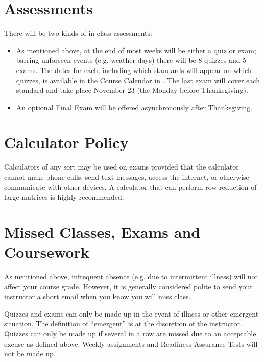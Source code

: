\documentclass{article}
\begin{document}
\section*{\fontsize{12}{15}\selectfont Assessments}
There will be two kinds of in class assessments:
\begin{itemize}
\item As mentioned above, at the end of most weeks will be either a quiz or exam; barring unforseen events (e.g. weather days) there will be 8 quizzes and 5 exams.   The dates for each, including which standards will appear on which quizzes, is available in the Course Calendar in \LMS. The last exam will cover each standard and take place November 23 (the Monday before Thanksgiving).
\item An optional Final Exam will be offered asynchronously after Thanksgiving. 
\end{itemize}

\section*{\fontsize{12}{15}\selectfont Calculator Policy}

Calculators of any sort may be used on exams provided that the calculator cannot make phone calls, send text messages, access the internet, or otherwise communicate with other devices.  A calculator that can perform row reduction of large matrices is highly recommended.

\section*{\fontsize{12}{15}\selectfont Missed Classes, Exams and Coursework}

As mentioned above, infrequent absence (e.g. due to intermittent illness) will not affect your course grade.  However, it is generally considered polite to send your instructor a short email when you know you will miss class.  

Quizzes and exams can only be made up in the event of illness or other emergent situation.  The definition of ``emergent'' is at the discretion of the instructor. Quizzes can only be made up if several in a row are missed due to an acceptable excuse as defined above. Weekly assignments and Readiness Assurance Tests will not be made up. 
\end{document}
